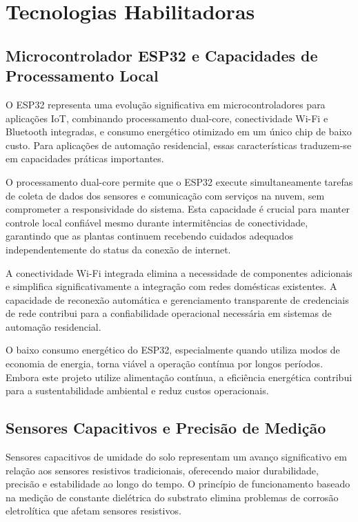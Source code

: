 \documentclass[twoside,english,brazilian]{UNISINOSmonografia}
\begin{document}
\section{Tecnologias Habilitadoras}

\subsection{Microcontrolador ESP32 e Capacidades de Processamento Local}

O ESP32 representa uma evolução significativa em microcontroladores para aplicações IoT, combinando processamento dual-core, conectividade Wi-Fi e Bluetooth integradas, e consumo energético otimizado em um único chip de baixo custo. Para aplicações de automação residencial, essas características traduzem-se em capacidades práticas importantes.

O processamento dual-core permite que o ESP32 execute simultaneamente tarefas de coleta de dados dos sensores e comunicação com serviços na nuvem, sem comprometer a responsividade do sistema. Esta capacidade é crucial para manter controle local confiável mesmo durante intermitências de conectividade, garantindo que as plantas continuem recebendo cuidados adequados independentemente do status da conexão de internet.

A conectividade Wi-Fi integrada elimina a necessidade de componentes adicionais e simplifica significativamente a integração com redes domésticas existentes. A capacidade de reconexão automática e gerenciamento transparente de credenciais de rede contribui para a confiabilidade operacional necessária em sistemas de automação residencial.

O baixo consumo energético do ESP32, especialmente quando utiliza modos de economia de energia, torna viável a operação contínua por longos períodos. Embora este projeto utilize alimentação contínua, a eficiência energética contribui para a sustentabilidade ambiental e reduz custos operacionais.

\subsection{Sensores Capacitivos e Precisão de Medição}

Sensores capacitivos de umidade do solo representam um avanço significativo em relação aos sensores resistivos tradicionais, oferecendo maior durabilidade, precisão e estabilidade ao longo do tempo. O princípio de funcionamento baseado na medição de constante dielétrica do substrato elimina problemas de corrosão eletrolítica que afetam sensores resistivos.
\end{document}
